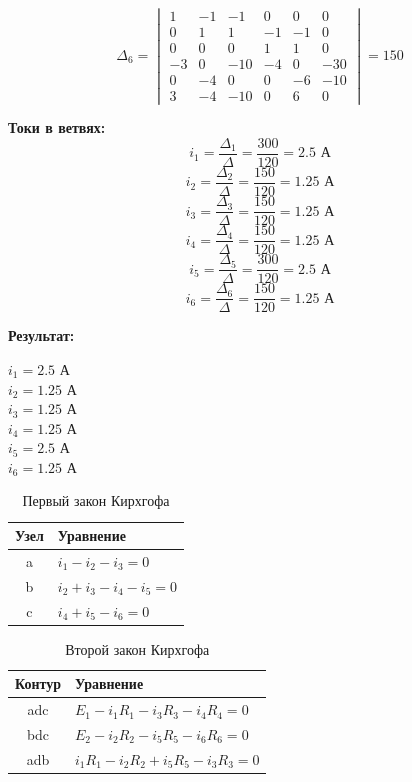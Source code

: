 $$\Delta_6 = \begin{vmatrix}
1 & -1 & -1 & 0 & 0 & 0 \\
0 & 1 & 1 & -1 & -1 & 0 \\
0 & 0 & 0 & 1 & 1 & 0 \\
-3 & 0 & -10 & -4 & 0 & -30 \\
0 & -4 & 0 & 0 & -6 & -10 \\
3 & -4 & -10 & 0 & 6 & 0
\end{vmatrix} = 150$$

\textbf{Токи в ветвях:}
$$i_1 = \frac{\Delta_1}{\Delta} = \frac{300}{120} = 2.5 \text{ А}$$
$$i_2 = \frac{\Delta_2}{\Delta} = \frac{150}{120} = 1.25 \text{ А}$$
$$i_3 = \frac{\Delta_3}{\Delta} = \frac{150}{120} = 1.25 \text{ А}$$
$$i_4 = \frac{\Delta_4}{\Delta} = \frac{150}{120} = 1.25 \text{ А}$$
$$i_5 = \frac{\Delta_5}{\Delta} = \frac{300}{120} = 2.5 \text{ А}$$
$$i_6 = \frac{\Delta_6}{\Delta} = \frac{150}{120} = 1.25 \text{ А}$$

\textbf{Результат:}
\begin{flushleft}
$i_1 = 2.5$ А \\
$i_2 = 1.25$ А \\
$i_3 = 1.25$ А \\
$i_4 = 1.25$ А \\
$i_5 = 2.5$ А \\
$i_6 = 1.25$ А
\end{flushleft}

\begin{table}[H]
\centering
\begin{tabular}{|c|l|}
\hline
\textbf{Узел} & \textbf{Уравнение} \\
\hline
a & $i_1 - i_2 - i_3 = 0$ \\
\hline
b & $i_2 + i_3 - i_4 - i_5 = 0$ \\
\hline
c & $i_4 + i_5 - i_6 = 0$ \\
\hline
\end{tabular}
\caption{Первый закон Кирхгофа}
\label{tab:kirchhoff_first_law}
\end{table}

\begin{table}[H]
\centering
\begin{tabular}{|c|l|}
\hline
\textbf{Контур} & \textbf{Уравнение} \\
\hline
adc & $E_1 - i_1R_1 - i_3R_3 - i_4R_4 = 0$ \\
\hline
bdc & $E_2 - i_2R_2 - i_5R_5 - i_6R_6 = 0$ \\
\hline
adb & $i_1R_1 - i_2R_2 + i_5R_5 - i_3R_3 = 0$ \\
\hline
\end{tabular}
\caption{Второй закон Кирхгофа}
\label{tab:kirchhoff_second_law}
\end{table}



